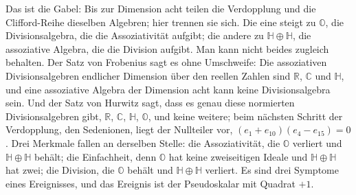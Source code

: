 \documentclass[11pt,a4paper]{article}
\newcommand{\R}{\mathbb R}
\newcommand{\C}{\mathbb C}
\newcommand{\HH}{\mathbb H}
\newcommand{\Oc}{\mathbb O}
\begin{document}
Das ist die Gabel: Bis zur Dimension acht teilen die Verdopplung und die Clifford-Reihe dieselben Algebren; hier trennen sie sich. Die eine steigt zu $\Oc$, die Divisionsalgebra, die die Assoziativität aufgibt; die andere zu $\HH\oplus\HH$, die assoziative Algebra, die die Division aufgibt. Man kann nicht beides zugleich behalten. Der Satz von Frobenius sagt es ohne Umschweife: Die assoziativen Divisionsalgebren endlicher Dimension über den reellen Zahlen sind $\R$, $\C$ und $\HH$, und eine assoziative Algebra der Dimension acht kann keine Divisionsalgebra sein. Und der Satz von Hurwitz sagt, dass es genau diese normierten Divisionsalgebren gibt, $\R$, $\C$, $\HH$, $\Oc$, und keine weitere; beim nächsten Schritt der Verdopplung, den Sedenionen, liegt der Nullteiler vor, $(e_1+e_{10})(e_4-e_{15})=0$. Drei Merkmale fallen an derselben Stelle: die Assoziativität, die $\Oc$ verliert und $\HH\oplus\HH$ behält; die Einfachheit, denn $\Oc$ hat keine zweiseitigen Ideale und $\HH\oplus\HH$ hat zwei; die Division, die $\Oc$ behält und $\HH\oplus\HH$ verliert. Es sind drei Symptome eines Ereignisses, und das Ereignis ist der Pseudoskalar mit Quadrat $+1$.
\end{document}
